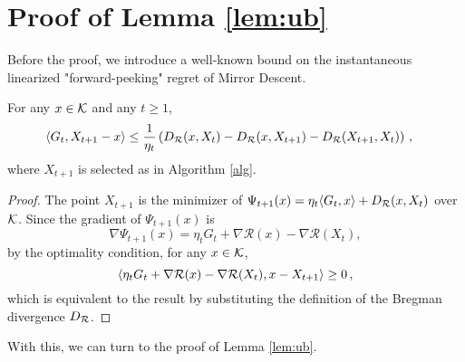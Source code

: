 \fi

\section{Proof of Lemma \ref{lem:ub}}
\label{sec:lemub-proof}
\label{sec:ublemma-proof}
Before the proof, we introduce a well-known bound on the instantaneous linearized "forward-peeking" regret of Mirror Descent.
\begin{lemma}
\label{lem:mdlinregret}
For any $x \in \mathcal{K}$ and any $t \ge 1$,
\begin{align*}
\MoveEqLeft
\ip{G_t, X_{t+1}-x}
\le \dfrac{1}{\eta_t} \left( \DR(x,X_t)-\DR(x,X_{t+1})-\DR(X_{t+1},X_t) \right)\,,
\end{align*}
where $X_{t+1}$ is selected as in Algorithm \ref{alg}.
\end{lemma}
\begin{proof}
The point $X_{t+1}$ is the minimizer of
$\Psi_{t+1}(x)=\eta_t \langle G_t,x \rangle+D_{\mathcal{R}}(x,X_t)$ over $\mathcal{K}$. Since the gradient of $\Psi_{t+1}(x)$ is
\[
\nabla \Psi_{t+1}(x) = \eta_t G_t + \nabla\mathcal{R}(x)-\nabla\mathcal{R}(X_t),
\]
by the optimality condition, for any $x \in \mathcal{K}$,
\[
\langle \eta_t G_t + \nabla\mathcal{R}(x)-\nabla\mathcal{R}(X_t), x-X_{t+1} \rangle\ge 0 \,,
\]
which is equivalent to the result by substituting the definition of the Bregman divergence $D_{\mathcal{R}}$.
\end{proof}

With this, we can turn to the proof of Lemma \ref{lem:ub}.

